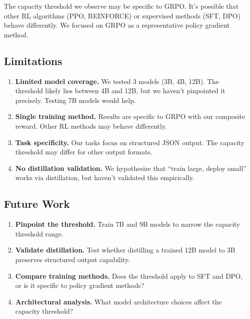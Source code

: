 \documentclass[11pt]{article}
\begin{document}
The capacity threshold we observe may be specific to GRPO.
It's possible that other RL algorithms (PPO, REINFORCE) or supervised methods (SFT, DPO) behave differently.
We focused on GRPO as a representative policy gradient method.

\subsection{Limitations}

\begin{enumerate}[leftmargin=12pt]
    \item \textbf{Limited model coverage.} We tested 3 models (3B, 4B, 12B). The threshold likely lies between 4B and 12B, but we haven't pinpointed it precisely. Testing 7B models would help.

    \item \textbf{Single training method.} Results are specific to GRPO with our composite reward. Other RL methods may behave differently.

    \item \textbf{Task specificity.} Our tasks focus on structured JSON output. The capacity threshold may differ for other output formats.

    \item \textbf{No distillation validation.} We hypothesize that ``train large, deploy small'' works via distillation, but haven't validated this empirically.
\end{enumerate}

\subsection{Future Work}

\begin{enumerate}[leftmargin=12pt]
    \item \textbf{Pinpoint the threshold.} Train 7B and 9B models to narrow the capacity threshold range.

    \item \textbf{Validate distillation.} Test whether distilling a trained 12B model to 3B preserves structured output capability.

    \item \textbf{Compare training methods.} Does the threshold apply to SFT and DPO, or is it specific to policy gradient methods?

    \item \textbf{Architectural analysis.} What model architecture choices affect the capacity threshold?
\end{enumerate}
\end{document}
